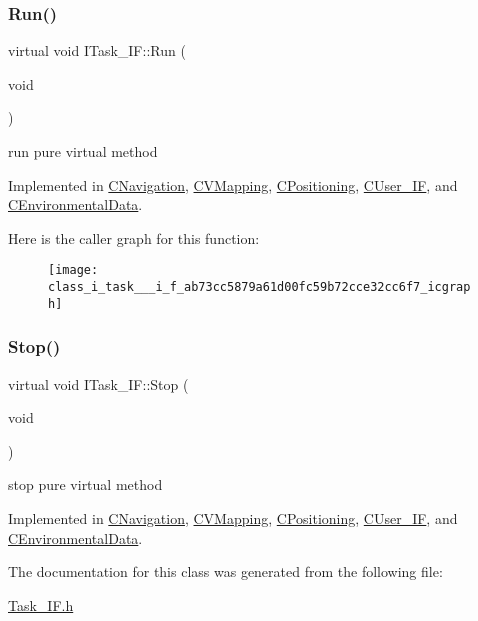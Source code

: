 \subsubsection{\texorpdfstring{Run()}{Run()}}
{\footnotesize\ttfamily virtual void I\+Task\+\_\+\+I\+F\+::\+Run (\begin{DoxyParamCaption}\item[{void}]{ }\end{DoxyParamCaption})\hspace{0.3cm}{\ttfamily [pure virtual]}}



run pure virtual method 



Implemented in \mbox{\hyperlink{class_c_navigation_a86acb1521aab400e542465c8eabed671}{C\+Navigation}}, \mbox{\hyperlink{class_c_v_mapping_a8f064fcfd01953d7072efd5de23f89ef}{C\+V\+Mapping}}, \mbox{\hyperlink{class_c_positioning_ad0e439dcc95c450548c2806077aeff57}{C\+Positioning}}, \mbox{\hyperlink{class_c_user___i_f_a1be2e11cd5df5ad0fa5a74a0eb283ec5}{C\+User\+\_\+\+IF}}, and \mbox{\hyperlink{class_c_environmental_data_a586a729d3aab2873812517d950c91242}{C\+Environmental\+Data}}.

Here is the caller graph for this function\+:
\nopagebreak
\begin{figure}[H]
\begin{center}
\leavevmode
\texttt{[image: class\_i\_task\_\_\_i\_f\_ab73cc5879a61d00fc59b72cce32cc6f7\_icgraph]}
\end{center}
\end{figure}
\mbox{\label{class_i_task___i_f_af5f8fba86704c7e36d0e4681d58300c6}} 
\subsubsection{\texorpdfstring{Stop()}{Stop()}}
{\footnotesize\ttfamily virtual void I\+Task\+\_\+\+I\+F\+::\+Stop (\begin{DoxyParamCaption}\item[{void}]{ }\end{DoxyParamCaption})\hspace{0.3cm}{\ttfamily [pure virtual]}}



stop pure virtual method 



Implemented in \mbox{\hyperlink{class_c_navigation_a3cc8f7fdd003d6b2c5056b87ff93edd9}{C\+Navigation}}, \mbox{\hyperlink{class_c_v_mapping_ad4e34f79b444109d0cbf1223881126dc}{C\+V\+Mapping}}, \mbox{\hyperlink{class_c_positioning_a2706c9bb6bb52201c279386fd2c9dd89}{C\+Positioning}}, \mbox{\hyperlink{class_c_user___i_f_ae241b3296f4dd7810897ed8631ede880}{C\+User\+\_\+\+IF}}, and \mbox{\hyperlink{class_c_environmental_data_a61a8f487f013602aab4dadcf8a9da4c8}{C\+Environmental\+Data}}.



The documentation for this class was generated from the following file\+:\begin{DoxyCompactItemize}
\item 
\mbox{\hyperlink{_task___i_f_8h}{Task\+\_\+\+I\+F.\+h}}\end{DoxyCompactItemize}
